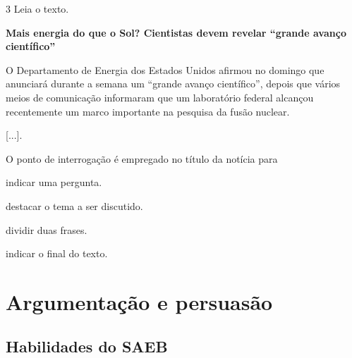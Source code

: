 \pagebreak
\num{3} Leia o texto.

\begin{myquote}
\textbf{Mais energia do que o Sol? Cientistas devem revelar “grande
avanço científico”}

O Departamento de Energia dos Estados Unidos afirmou no domingo que
anunciará durante a semana um “grande avanço científico”, depois que
vários meios de comunicação informaram que um laboratório federal
alcançou recentemente um marco importante na pesquisa da fusão nuclear.

{[}...{]}.

\end{myquote}

O ponto de interrogação é empregado no título da notícia para

\begin{minipage}{.5\textwidth}
\begin{escolha}
\item indicar uma pergunta.

\item destacar o tema a ser discutido.

\item dividir duas frases.

\item indicar o final do texto.
\end{escolha}
\end{minipage}


\chapter{Argumentação e persuasão}


\section*{Habilidades do SAEB}

